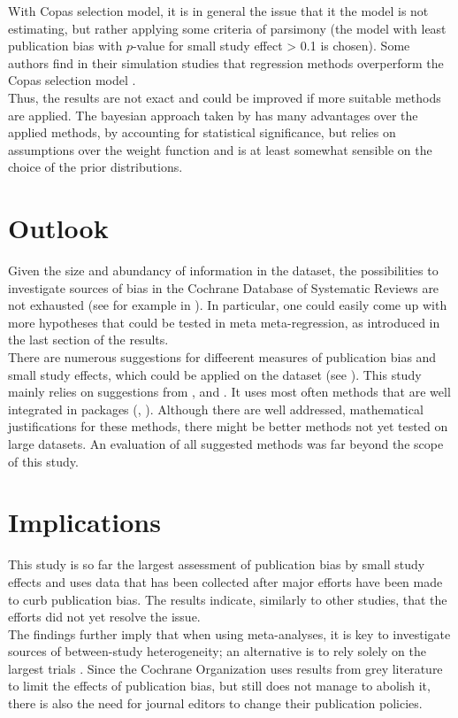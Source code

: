 \documentclass[11pt,a4paper,twoside]{book}\usepackage[]{graphicx}\usepackage[]{color}
\begin{document}
With Copas selection model, it is in general the issue that it the model is not estimating, but rather applying some criteria of parsimony (the model with least publication bias with $p$-value for small study effect > 0.1 is chosen). Some authors find in their simulation studies that regression methods overperform the Copas selection model \citep{limitmeta}. \\
Thus, the results are not exact and could be improved if more suitable methods are applied. The bayesian approach taken by \citet{kicinsky} has many advantages over the applied methods, \eg by accounting for statistical significance, but relies on assumptions over the weight function and is at least somewhat sensible on the choice of the prior distributions. \\

\section{Outlook}
Given the size and abundancy of information in the dataset, the possibilities to investigate sources of bias in the Cochrane Database of Systematic Reviews are not exhausted (see for example in \citet{ioannidis.2017}). In particular, one could easily come up with more hypotheses that could be tested in meta meta-regression, as introduced in the last section of the results. \\
There are numerous suggestions for diffeerent measures of publication bias and small study effects, which could be applied on the dataset (see \citet{mueller.2016}). This study mainly relies on suggestions from \citet{Sterne}, \citet{Ioannidis2007} and \citet{limitmeta}. It uses most often methods that are well integrated in packages (\citet{metafor.package}, \citet{meta.package}). Although there are well addressed, mathematical justifications for these methods, there might be better methods not yet tested on large datasets. An evaluation of all suggested methods was far beyond the scope of this study.


\section{Implications}
This study is so far the largest assessment of publication bias by small study effects and uses data that has been collected after major efforts have been made to curb publication bias. The results indicate, similarly to other studies, that the efforts did not yet resolve the issue. \\
The findings further imply that when using meta-analyses, it is key to investigate sources of between-study heterogeneity; an alternative is to rely solely on the largest trials \citep{largest.study.only}. Since the Cochrane Organization uses results from grey literature to limit the effects of publication bias, but still does not manage to abolish it, there is also the need for journal editors to change their publication policies.
\end{document}
